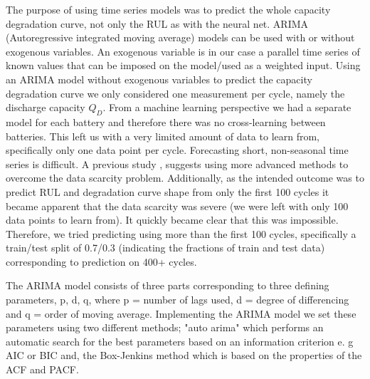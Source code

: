\documentclass{article}
\begin{document}
The purpose of using time series models was to predict the whole capacity degradation curve, not only the RUL as with the neural net. ARIMA (Autoregressive integrated moving average) models can be used with or without exogenous variables. An exogenous variable is in our case a parallel time series of known values that can be imposed on the model/used as a weighted input. Using an ARIMA model without exogenous variables to predict the capacity degradation curve we only considered one measurement per cycle, namely the discharge capacity $Q_D$. From a machine learning perspective we had a separate model for each battery and therefore there was no cross-learning between batteries. This left us with a very limited amount of data to learn from, specifically only one data point per cycle. Forecasting short, non-seasonal time series is difficult. A previous study \cite{timeSeries}, suggests using more advanced methods to overcome the data scarcity problem. Additionally, as the intended outcome was to predict RUL and degradation curve shape from only the first 100 cycles it became apparent that the data scarcity was severe (we were left with only 100 data points to learn from). It quickly became clear that this was impossible. Therefore, we tried predicting using more than the first 100 cycles, specifically a train/test split of 0.7/0.3 (indicating the fractions of train and test data) corresponding to prediction on 400+ cycles. 

The ARIMA model consists of three parts corresponding to three defining parameters, p, d, q, where p = number of lags used, d = degree of differencing and q = order of moving average. Implementing the ARIMA model we set these parameters using two different methods; "auto arima" which performs an automatic search for the best parameters based on an information criterion e. g AIC or BIC and, the Box-Jenkins method which is based on the properties of the ACF and PACF. 
\end{document}
